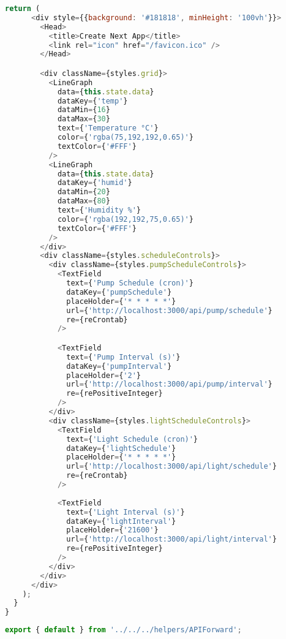 \documentclass[12pt,a4paper,oneside]{book}
\begin{document}
\begin{lstlisting}[title={raspberrypi/ui/pages/index.js}, language=JavaScript]
    return (
      <div style={{background: '#181818', minHeight: '100vh'}}>
        <Head>
          <title>Create Next App</title>
          <link rel="icon" href="/favicon.ico" />
        </Head>

        <div className={styles.grid}>
          <LineGraph
            data={this.state.data}
            dataKey={'temp'}
            dataMin={16}
            dataMax={30}
            text={'Temperature °C'}
            color={'rgba(75,192,192,0.65)'}
            textColor={'#FFF'}
          />
          <LineGraph
            data={this.state.data}
            dataKey={'humid'}
            dataMin={20}
            dataMax={80}
            text={'Humidity %'}
            color={'rgba(192,192,75,0.65)'}
            textColor={'#FFF'}
          />
        </div>
        <div className={styles.scheduleControls}>
          <div className={styles.pumpScheduleControls}>
            <TextField
              text={'Pump Schedule (cron)'}
              dataKey={'pumpSchedule'}
              placeHolder={'* * * * *'}
              url={'http://localhost:3000/api/pump/schedule'}
              re={reCrontab}
            />

            <TextField
              text={'Pump Interval (s)'}
              dataKey={'pumpInterval'}
              placeHolder={'2'}
              url={'http://localhost:3000/api/pump/interval'}
              re={rePositiveInteger}
            />
          </div>
          <div className={styles.lightScheduleControls}>
            <TextField
              text={'Light Schedule (cron)'}
              dataKey={'lightSchedule'}
              placeHolder={'* * * * *'}
              url={'http://localhost:3000/api/light/schedule'}
              re={reCrontab}
            />
            
            <TextField
              text={'Light Interval (s)'}
              dataKey={'lightInterval'}
              placeHolder={'21600'}
              url={'http://localhost:3000/api/light/interval'}
              re={rePositiveInteger}
            />
          </div>
        </div>
      </div>
    );
  }
}
\end{lstlisting}

\bigskip

\begin{lstlisting}[title={raspberrypi/ui/pages/api/light/interval.js}, language=JavaScript]
export { default } from '../../../helpers/APIForward';
\end{lstlisting}

\bigskip
\end{document}
